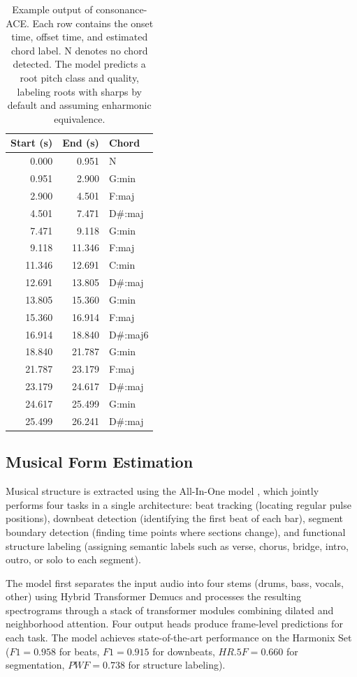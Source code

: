 \documentclass{article}
\newcommand{\rev}[1]{{\color{r2}#1}} %
\begin{document}
\begin{table}[ht]
\centering
\footnotesize
\begin{tabular}{rrl}
\toprule
\textbf{Start (s)} & \textbf{End (s)} & \textbf{Chord} \\
\midrule
0.000 & 0.951 & N \\
0.951 & 2.900 & G:min \\
2.900 & 4.501 & F:maj \\
4.501 & 7.471 & D\#:maj \\
7.471 & 9.118 & G:min \\
9.118 & 11.346 & F:maj \\
11.346 & 12.691 & C:min \\
12.691 & 13.805 & D\#:maj \\
13.805 & 15.360 & G:min \\
15.360 & 16.914 & F:maj \\
16.914 & 18.840 & D\#:maj6 \\
18.840 & 21.787 & G:min \\
21.787 & 23.179 & F:maj \\
23.179 & 24.617 & D\#:maj \\
24.617 & 25.499 & G:min \\
25.499 & 26.241 & D\#:maj \\
\bottomrule
\end{tabular}
\caption{Example output of consonance-ACE. Each row contains the onset time, offset time, and estimated chord label. N denotes no chord detected. \rev{The model predicts a root pitch class and quality, labeling roots with sharps by default and assuming enharmonic equivalence.}}
\label{tab:ace_output}
\end{table}

\subsection{Musical Form Estimation}
\label{sec:form_pipeline}
Musical structure is extracted using the All-In-One model \citep{taejun2023allinone}, which jointly performs four tasks in a single architecture: beat tracking (locating regular pulse positions), downbeat detection (identifying the first beat of each bar), segment boundary detection (finding time points where sections change), and functional structure labeling (assigning semantic labels such as verse, chorus, bridge, intro, outro, or solo to each segment).

The model first separates the input audio into four stems (drums, bass, vocals, other) using Hybrid Transformer Demucs \citep{rouard2023hybrid} and processes the resulting spectrograms through a stack of transformer modules combining dilated and neighborhood attention. Four output heads produce frame-level predictions for each task. The model achieves state-of-the-art performance on the Harmonix Set ($F1 = 0.958$ for beats, $F1 = 0.915$ for downbeats, $HR.5F = 0.660$ for segmentation, $PWF = 0.738$ for structure labeling).
\end{document}
